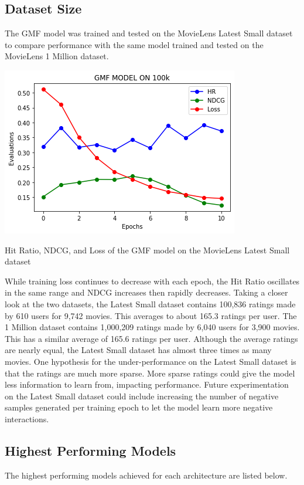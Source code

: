 \documentclass{article}
\begin{document}
\subsection{Dataset Size}
The GMF model was trained and tested on the MovieLens Latest Small dataset to compare performance with the same model trained and tested on the MovieLens 1 Million dataset.

\begin{center}
\includegraphics[scale=0.5]{GMF_100k}

Hit Ratio, NDCG, and Loss of the GMF model on the MovieLens Latest Small dataset
\end{center}

While training loss continues to decrease with each epoch, the Hit Ratio oscillates in the same range and NDCG increases then rapidly decreases. Taking a closer look at the two datasets, the Latest Small dataset contains 100,836 ratings made by 610 users for 9,742 movies. This averages to about 165.3 ratings per user. The 1 Million dataset contains 1,000,209 ratings made by 6,040 users for 3,900 movies. This has a similar average of 165.6 ratings per user. Although the average ratings are nearly equal, the Latest Small dataset has almost three times as many movies. One hypothesis for the under-performance on the Latest Small dataset is that the ratings are much more sparse. More sparse ratings could give the model less information to learn from, impacting performance. Future experimentation on the Latest Small dataset could include increasing the number of negative samples generated per training epoch to let the model learn more negative interactions.

\subsection{Highest Performing Models}
The highest performing models achieved for each architecture are listed below.
\end{document}
